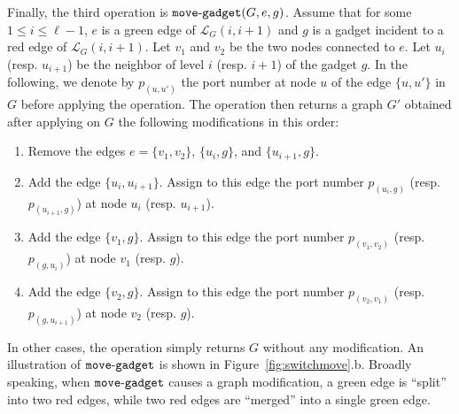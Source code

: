 \documentclass[11pt]{article}
\begin{document}
Finally, the third operation is ${\tt
    move\mbox{-}gadget}(G,e,g)$. Assume that for some $1\leq i\leq \ell-1$, $e$ is a green edge of
  $\mathcal{L}_G(i,i+1)$ and $g$ is a gadget incident to a red edge of $\mathcal{L}_G(i,i+1)$. Let $v_1$ and $v_2$ be the two nodes connected to $e$.
Let $u_i$ (resp. $u_{i+1}$) be the neighbor of level $i$ (resp. $i+1$)
  of the gadget $g$. In the following, we denote by $p_{(u,u')}$ the
  port number at node $u$ of the edge $\{u,u'\}$ in $G$ before applying
  the operation. 
The operation then returns a graph $G'$ obtained after applying on
  $G$ the following modifications in this order:
  \begin{enumerate}
  \item Remove the edges $e=\{v_1,v_2\}$, $\{u_i,g\}$, and $\{u_{i+1},g\}$.

  \item Add the edge $\{u_i,u_{i+1}\}$. Assign to this edge the port number $p_{(u_i,g)}$ (resp.  $p_{(u_{i+1},g)}$) at node $u_i$ (resp.
    $u_{i+1}$).

    \item Add the edge $\{v_1,g\}$. Assign to this edge the port number
      $p_{(v_1,v_2)}$ (resp. $p_{(g,u_i)}$) at node $v_1$ (resp. $g$).
      
    \item Add the edge $\{v_2,g\}$. Assign to this edge
      the port number $p_{(v_2,v_1)}$ (resp. $p_{(g,u_{i+1})}$) at node $v_2$ (resp. $g$).
  \end{enumerate}
  
In other cases, the operation simply returns $G$ without any modification. An illustration of ${\tt move\mbox{-}gadget}$ is shown in Figure~\ref{fig:switchmove}.b. Broadly speaking, when ${\tt move\mbox{-}gadget}$ causes a graph modification, a green edge is ``split'' into two red edges, while two red edges are ``merged'' into a single green edge.
\end{document}

